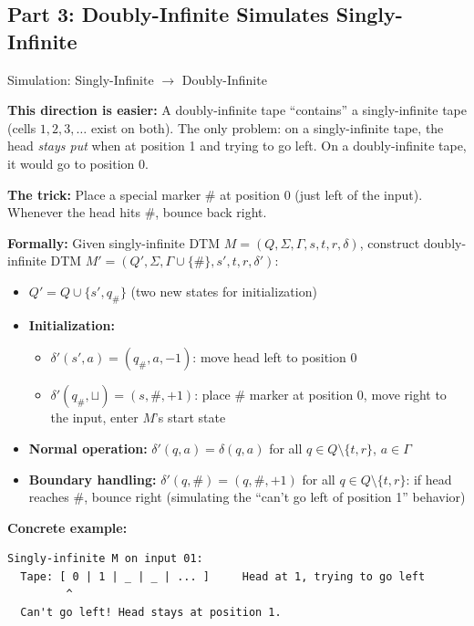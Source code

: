 \documentclass[11pt,a4paper]{article}
\begin{document}
\subsection{Part 3: Doubly-Infinite Simulates Singly-Infinite}

\begin{examplebox}{{Simulation: Singly-Infinite $\to$ Doubly-Infinite}}

\textbf{This direction is easier:} A doubly-infinite tape ``contains'' a singly-infinite tape (cells $1, 2, 3, \ldots$ exist on both). The only problem: on a singly-infinite tape, the head \textit{stays put} when at position 1 and trying to go left. On a doubly-infinite tape, it would go to position 0.

\textbf{The trick:} Place a special marker $\#$ at position 0 (just left of the input). Whenever the head hits $\#$, bounce back right.

\textbf{Formally:} Given singly-infinite DTM $M = (Q, \Sigma, \Gamma, s, t, r, \delta)$, construct doubly-infinite DTM $M' = (Q', \Sigma, \Gamma \cup \{\#\}, s', t, r, \delta')$:

\begin{itemize}[nosep]
\item $Q' = Q \cup \{s', q_\#\}$ (two new states for initialization)
\item \textbf{Initialization:}
  \begin{itemize}[nosep]
  \item $\delta'(s', a) = (q_\#, a, -1)$: move head left to position 0
  \item $\delta'(q_\#, \sqcup) = (s, \#, +1)$: place $\#$ marker at position 0, move right to the input, enter $M$'s start state
  \end{itemize}
\item \textbf{Normal operation:} $\delta'(q, a) = \delta(q, a)$ for all $q \in Q \setminus \{t,r\}$, $a \in \Gamma$
\item \textbf{Boundary handling:} $\delta'(q, \#) = (q, \#, +1)$ for all $q \in Q \setminus \{t,r\}$: if head reaches $\#$, bounce right (simulating the ``can't go left of position 1'' behavior)
\end{itemize}

\textbf{Concrete example:}
\begin{lstlisting}
Singly-infinite M on input 01:
  Tape: [ 0 | 1 | _ | _ | ... ]     Head at 1, trying to go left
         ^
  Can't go left! Head stays at position 1.


\end{lstlisting}
\end{examplebox}
\end{document}
